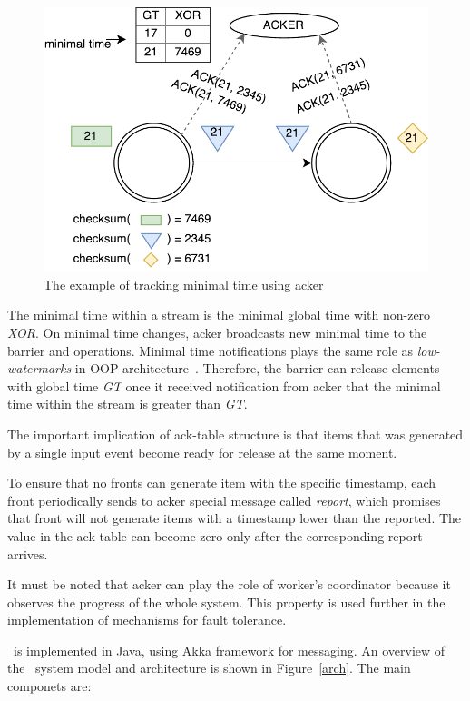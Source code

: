 \begin{figure}[htbp]
  \centering
  \includegraphics[scale=0.58]{pics/acker}
  \caption{The example of tracking minimal time using acker}
  \label {acker}
\end{figure}

The minimal time within a stream is the minimal global time with non-zero {\it XOR}. On minimal time changes, acker broadcasts new minimal time to the barrier and operations. Minimal time notifications plays the same role as {\em low-watermarks} in OOP architecture~\cite{Li:2008:OPN:1453856.1453890}. Therefore, the barrier can release elements with global time {\it GT} once it received notification from acker that the minimal time within the stream is greater than {\it GT}.

The important implication of ack-table structure is that items that was generated by a single input event become ready for release at the same moment.

To ensure that no fronts can generate item with the specific timestamp, each front periodically sends to acker special message called {\it report}, which promises that front will not generate items with a timestamp lower than the reported. The value in the ack table can become zero only after the corresponding report arrives.

It must be noted that acker can play the role of worker's coordinator because it observes the progress of the whole system. This property is used further in the implementation of mechanisms for fault tolerance. 

\FlameStream\ is implemented in Java, using Akka framework for messaging. An overview of the \FlameStream\ system model and architecture is shown in Figure~\ref{arch}. The main componets are:

